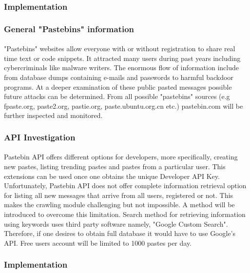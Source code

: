 \documentclass[12pt]{article}
\begin{document}
\subsubsection{Implementation}
\subsubsection*{General "Pastebins" information}
\paragraph{}
"Pastebins" websites \cite{fpaste} \cite{pastebin} allow everyone with or without registration to share real time text or code snippets. It attracted many users during past years including cybercriminals like malware writers\cite{pastebin-magazine}. The enormous flow of information include from database dumps containing e-mails and passwords to harmful backdoor programs. At a deeper examination of these public pasted messages possible future attacks can be determined. From all possible "pastebins" sources (e.g fpaste.org, paste2.org, pastie.org\cite{pastebin-pastie}, paste.ubuntu.org.cn \cite{pastebin-ubuntu} etc.) pastebin.com \cite{pastebin} will be further inspected and monitored.

\subsubsection{API Investigation}
\parbox{\linewidth}{
\paragraph{}
Pastebin API offers different options for developers, more specifically, creating new pastes, listing trending pastes and pastes from a particular user. This extensions can be used once one obtains the unique Developer API Key. 
Unfortunately, Pastebin API \cite{pastebin} does not offer complete information retrieval option for listing all new messages that arrive from all users, registered or not. This makes the crawling module challenging but not impossible. A method will be introduced to overcome this limitation. Search method for retrieving information using keywords uses third party software namely, "Google Custom Search". Therefore, if one desires to obtain full database it would have to use Google's API. Free users account will be limited to 1000 pastes per day. 
}

\subsubsection{Implementation}
\end{document}
